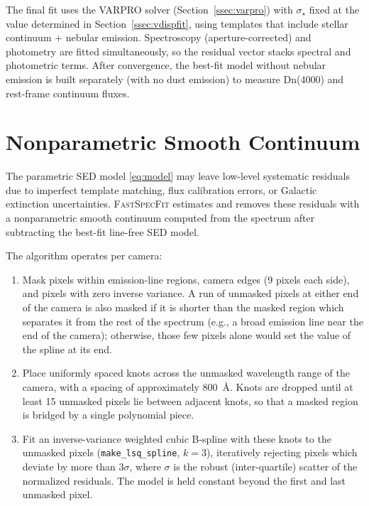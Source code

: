 \documentclass[12pt]{article}
\newcommand{\vdisp}{\sigma_{\star}}
\begin{document}
The final fit uses the VARPRO solver (Section~\ref{ssec:varpro}) with $\vdisp$
fixed at the value determined in Section~\ref{ssec:vdispfit}, using templates
that include stellar continuum $+$ nebular emission.  Spectroscopy
(aperture-corrected) and photometry are fitted simultaneously, so the
residual vector stacks spectral and photometric terms.  After convergence,
the best-fit model without nebular emission is built separately (with no
dust emission) to measure Dn(4000) and rest-frame continuum fluxes.


\section{Nonparametric Smooth Continuum}
\label{sec:smooth}

The parametric SED model \eqref{eq:model} may leave low-level systematic
residuals due to imperfect template matching, flux calibration errors, or
Galactic extinction uncertainties.  \textsc{FastSpecFit} estimates and
removes these residuals with a nonparametric smooth continuum computed from
the spectrum after subtracting the best-fit line-free SED model.

The algorithm operates per camera:
\begin{enumerate}
  \item Mask pixels within emission-line regions, camera edges (9 pixels
    each side), and pixels with zero inverse variance.  A run of unmasked
    pixels at either end of the camera is also masked if it is shorter than
    the masked region which separates it from the rest of the spectrum
    (e.g., a broad emission line near the end of the camera); otherwise,
    those few pixels alone would set the value of the spline at its end.
  \item Place uniformly spaced knots across the unmasked wavelength range
    of the camera, with a spacing of approximately 800~\AA.  Knots are
    dropped until at least 15 unmasked pixels lie between adjacent knots,
    so that a masked region is bridged by a single polynomial piece.
  \item Fit an inverse-variance weighted cubic B-spline with these knots to
    the unmasked pixels (\texttt{make\_lsq\_spline}, $k=3$), iteratively
    rejecting pixels which deviate by more than $3\sigma$, where $\sigma$ is
    the robust (inter-quartile) scatter of the normalized residuals.  The
    model is held constant beyond the first and last unmasked pixel.
\end{enumerate}
\end{document}
